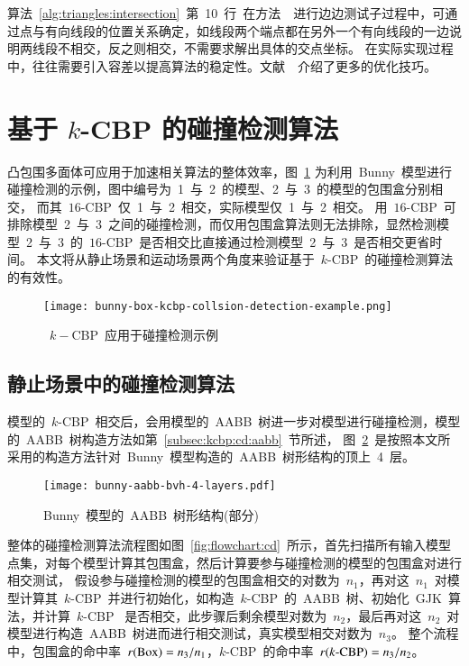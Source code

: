 算法~\ref{alg:triangles:intersection}~第~10~行~在方法~~进行边边测试子过程中，可通过点与有向线段的位置关系确定，如线段两个端点都在另外一个有向线段的一边说明两线段不相交，反之则相交，不需要求解出具体的交点坐标。
在实际实现过程中，往往需要引入容差以提高算法的稳定性。文献~~介绍了更多的优化技巧。

\FloatBarrier
\section{基于 $k$-CBP 的碰撞检测算法}
\label{sec:cd:baseon:kcbp}

凸包围多面体可应用于加速相关算法的整体效率，图~\ref{lbl:bunny-box-kcbp-collsion-detection-example}
为利用~Bunny~模型进行碰撞检测的示例，图中编号为~1~与~2~的模型、2~与~3~的模型的包围盒分别相交， 而其~$16$-CBP~仅~1~与~2~相交，实际模型仅~1~与~2~相交。
用~$16$-CBP~可排除模型~2~与~3~之间的碰撞检测，而仅用包围盒算法则无法排除，显然检测模型~2~与~3~的~$16$-CBP~是否相交比直接通过检测模型~2~与~3~是否相交更省时间。
本文将从静止场景和运动场景两个角度来验证基于~$k$-CBP~的碰撞检测算法的有效性。 

\begin{figure}[htbp] 
\centering
\texttt{[image: bunny-box-kcbp-collsion-detection-example.png]}
\caption{~$k-$CBP~应用于碰撞检测示例}
\label{lbl:bunny-box-kcbp-collsion-detection-example}
\end{figure}

\subsection{静止场景中的碰撞检测算法}
\label{subsec:static:cd}

模型的~$k$-CBP~相交后，会用模型的~AABB~树进一步对模型进行碰撞检测，模型的~AABB~树构造方法如第~\ref{subsec:kcbp:cd:aabb}~节所述，
图~\ref{fig:bunny:aabb:bvh:toplayer4}~是按照本文所采用的构造方法针对~Bunny~模型构造的~AABB~树形结构的顶上~4~层。

\begin{figure}[htpb]
  \centering
  \texttt{[image: bunny-aabb-bvh-4-layers.pdf]}
  \caption{Bunny~模型的~AABB~树形结构(部分)}
  \label{fig:bunny:aabb:bvh:toplayer4}
\end{figure}

整体的碰撞检测算法流程图如图~\ref{fig:flowchart:cd}~所示，首先扫描所有输入模型点集，对每个模型计算其包围盒，然后计算要参与碰撞检测的模型的包围盒对进行相交测试，
假设参与碰撞检测的模型的包围盒相交的对数为~$n_1$，再对这~$n_1$~对模型计算其~$k$-CBP~并进行初始化，如构造~$k$-CBP~的~AABB~树、初始化~GJK~算法，并计算~$k$-CBP~
是否相交，此步骤后剩余模型对数为~$n_2$，最后再对这~$n_2$~对模型进行构造~AABB~树进而进行相交测试，真实模型相交对数为~$n_3$。
整个流程中，包围盒的命中率~$r(\textnormal{Box})=n_3 / n_1$，$k$-CBP~的命中率~$r(k\textnormal{-CBP})=n_3/n_2$。

